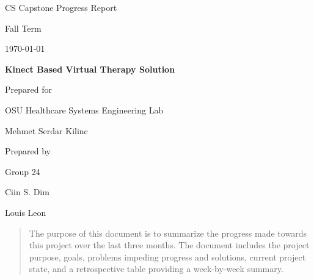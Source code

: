 \documentclass[onecolumn, draftclsnofoot,10pt, compsoc]{IEEEtran}
\def \CapstoneTeamName{     TeamName}
\def \CapstoneTeamNumber{       24}
\def \GroupMemberOne{            Ciin S. Dim}
\def \GroupMemberTwo{           Louis Leon}
\def \CapstoneProjectName{      Kinect Based Virtual Therapy Solution}
\def \CapstoneSponsorCompany{   OSU Healthcare Systems Engineering Lab}
\def \CapstoneSponsorPerson{        Mehmet Serdar Kilinc}
\def \DocType{      %
                Progress Report
                }
\newcommand{\NameSigPair}[1]{\par
\makebox[2.75in][r]{#1} \hfil   \makebox[3.25in]{\makebox[2.25in]{\hrulefill} \hfill        \makebox[.75in]{\hrulefill}}
\par\vspace{-12pt} \textit{\tiny\noindent
\makebox[2.75in]{} \hfil        \makebox[3.25in]{\makebox[2.25in][r]{Signature} \hfill  \makebox[.75in][r]{Date}}}}
\renewcommand{\NameSigPair}[1]{#1}
\begin{document}
\begin{titlepage}
    \begin{singlespace}
        \hfill 
        \par\vspace{.2in}
        \centering
        \scshape{
            \huge CS Capstone\DocType \par
            {\large Fall Term}\par
            {\large\today}\par
            \vspace{.5in}
            \textbf{\Huge\CapstoneProjectName}\par
            \vfill
            {\large Prepared for}\par
            \Huge \CapstoneSponsorCompany\par
            \vspace{5pt}
            {\Large\NameSigPair{\CapstoneSponsorPerson}\par}
            {\large Prepared by }\par
            Group\CapstoneTeamNumber\par
            \vspace{5pt}
            {\Large
                \NameSigPair{\GroupMemberOne}\par
                \NameSigPair{\GroupMemberTwo}\par
            }
            \vspace{20pt}
        }
        \begin{abstract}
        The purpose of this document is to summarize the progress made towards this project over the last three months. The document includes the project purpose, goals, problems impeding progress and solutions, current project state, and a retrospective table providing a week-by-week summary.
    \end{abstract}     
    \end{singlespace}
\end{titlepage}
\newpage
{}
\tableofcontents
\clearpage
\end{document}
